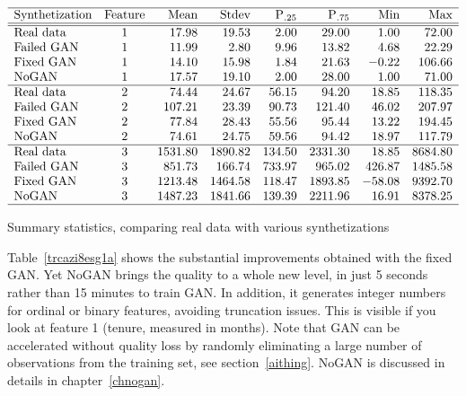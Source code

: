 \documentclass[oneside,10pt]{book}
\renewcommand{\arraystretch}{1.4} %
\begin{document}
\begin{table}[H]
\small
\[
\begin{array}{lcrrrrrr}
\hline
\text{Synthetization}	&  \text{Feature} & \text{Mean} & \text{Stdev} & \text{P$_{.25}$} & \text{P$_{.75}$} & \text{Min} & \text{Max}\\
\hline
\hline
 \text{Real data} &  1  &  17.98 &	19.53	&2.00	&29.00&	1.00	&72.00 \\
\text{Failed GAN} &  1 &11.99&	2.80&	9.96&	13.82&	4.68&	22.29\\
\text{Fixed GAN} &  1  &  14.10&	15.98&	1.84&	21.63&	-0.22&	106.66 \\
\text{NoGAN} &  1      &  17.57 &	19.10&	2.00&	28.00&	1.00&	71.00 \\
\hline
\text{Real data} &  2  &  74.44&	24.67&	56.15&	94.20&	18.85&	118.35 \\
\text{Failed GAN} &  2 &107.21&	23.39&	90.73&	121.40&	46.02&	207.97\\
\text{Fixed GAN} &  2  & 77.84&	28.43&	55.56&	95.44&	13.22&	194.45\\
\text{NoGAN} &  2      &  74.61&	24.75&	59.56&	94.42&	18.97&	117.79 \\
\hline
\text{Real data} &  3& 1531.80&	1890.82&	134.50&	2331.30&	18.85&	8684.80 \\
\text{Failed GAN} &  3 &851.73&	166.74&	733.97&	965.02&	426.87&	1485.58\\
\text{Fixed GAN} &  3      &  1213.48&	1464.58&	118.47&	1893.85&	-58.08&	9392.70 \\
\text{NoGAN} &  3  & 1487.23&	1841.66&	139.39&	2211.96&	16.91&	8378.25\\
\hline
\end{array}
\]
\caption{\label{trcazi8esg1a} Summary statistics, comparing real data with various synthetizations}
\end{table}

Table~\ref{trcazi8esg1a} shows the substantial improvements obtained with the fixed GAN. Yet NoGAN brings the quality to
 a whole new level, in just 5 seconds rather than 15 minutes to train GAN. In addition, it generates integer numbers for ordinal or binary features, avoiding truncation issues. This is visible if you look at feature 1 (tenure, measured in months). Note that GAN can be accelerated without quality loss by randomly eliminating
 a large number of observations from the training set, see section~\ref{aithing}. NoGAN is discussed in details in chapter~\ref{chnogan}.
\end{document}
